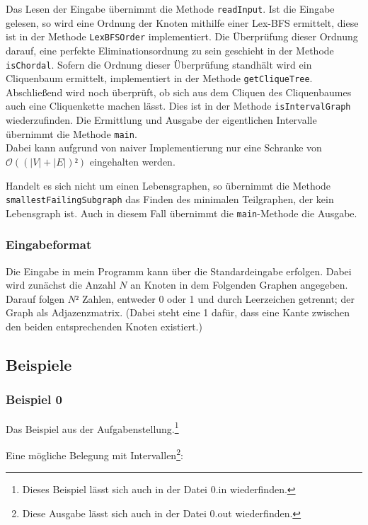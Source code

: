 Das Lesen der Eingabe übernimmt die Methode \texttt{readInput}. Ist die Eingabe gelesen, so wird eine Ordnung der Knoten mithilfe einer Lex-BFS ermittelt, diese ist in der Methode \texttt{LexBFSOrder} implementiert. Die Überprüfung dieser Ordnung darauf, eine perfekte Eliminationsordnung zu sein geschieht in der Methode \texttt{isChordal}. Sofern die Ordnung dieser Überprüfung standhält wird ein Cliquenbaum ermittelt, implementiert in der Methode \texttt{getCliqueTree}. Abschließend wird noch überprüft, ob sich aus dem Cliquen des Cliquenbaumes auch eine Cliquenkette machen lässt. Dies ist in der Methode \texttt{isIntervalGraph} wiederzufinden. Die Ermittlung und Ausgabe der eigentlichen Intervalle übernimmt die Methode \texttt{main}.\\
Dabei kann aufgrund von naiver Implementierung nur eine Schranke von $\mathcal{O}((|V| + |E|)²)$ eingehalten werden.

Handelt es sich nicht um einen Lebensgraphen, so übernimmt die Methode \texttt{smallestFailingSubgraph} das Finden des minimalen Teilgraphen, der kein Lebensgraph ist. Auch in diesem Fall übernimmt die \texttt{main}-Methode die Ausgabe.

\subsubsection{Eingabeformat}

Die Eingabe in mein Programm kann über die Standardeingabe erfolgen. Dabei wird zunächst die Anzahl $N$ an Knoten in dem Folgenden Graphen angegeben. Darauf folgen $N²$ Zahlen, entweder 0 oder 1 und durch Leerzeichen getrennt; der Graph als Adjazenzmatrix. (Dabei steht eine 1 dafür, dass eine Kante zwischen den beiden entsprechenden Knoten existiert.)
 
\subsection{Beispiele}
\subsubsection*{Beispiel 0}
Das Beispiel aus der Aufgabenstellung.\footnote{Dieses Beispiel lässt sich auch in der Datei 0.in wiederfinden.}

{\small

}

Eine mögliche Belegung mit Intervallen\footnote{Diese Ausgabe lässt sich auch in der Datei 0.out wiederfinden.}:

